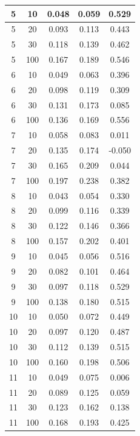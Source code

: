 \begin{longtable}{ |c|c|c|c|c| }
            5 & 10 & 0.048 & 0.059 & 0.529 \\ \hline
            5 & 20 & 0.093 & 0.113 & 0.443 \\ \hline
            5 & 30 & 0.118 & 0.139 & 0.462 \\ \hline
            5 & 100 & 0.167 & 0.189 & 0.546 \\ \hline
            6 & 10 & 0.049 & 0.063 & 0.396 \\ \hline
            6 & 20 & 0.098 & 0.119 & 0.309 \\ \hline
            6 & 30 & 0.131 & 0.173 & 0.085 \\ \hline
            6 & 100 & 0.136 & 0.169 & 0.556 \\ \hline
            7 & 10 & 0.058 & 0.083 & 0.011 \\ \hline
            7 & 20 & 0.135 & 0.174 & -0.050 \\ \hline
            7 & 30 & 0.165 & 0.209 & 0.044 \\ \hline
            7 & 100 & 0.197 & 0.238 & 0.382 \\ \hline
            8 & 10 & 0.043 & 0.054 & 0.330 \\ \hline
            8 & 20 & 0.099 & 0.116 & 0.339 \\ \hline
            8 & 30 & 0.122 & 0.146 & 0.366 \\ \hline
            8 & 100 & 0.157 & 0.202 & 0.401 \\ \hline
            9 & 10 & 0.045 & 0.056 & 0.516 \\ \hline
            9 & 20 & 0.082 & 0.101 & 0.464 \\ \hline
            9 & 30 & 0.097 & 0.118 & 0.529 \\ \hline
            9 & 100 & 0.138 & 0.180 & 0.515 \\ \hline
            10 & 10 & 0.050 & 0.072 & 0.449 \\ \hline
            10 & 20 & 0.097 & 0.120 & 0.487 \\ \hline
            10 & 30 & 0.112 & 0.139 & 0.515 \\ \hline
            10 & 100 & 0.160 & 0.198 & 0.506 \\ \hline
            11 & 10 & 0.049 & 0.075 & 0.006 \\ \hline
            11 & 20 & 0.089 & 0.125 & 0.059 \\ \hline
            11 & 30 & 0.123 & 0.162 & 0.138 \\ \hline
            11 & 100 & 0.168 & 0.193 & 0.425 \\ \hline

\end{longtable}
